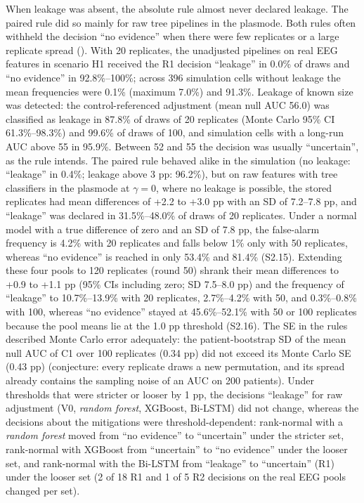 When leakage was absent, the absolute rule almost never declared leakage. The paired rule did so mainly for raw tree pipelines in the plasmode. Both rules often withheld the decision ``no evidence'' when there were few replicates or a large replicate spread ().
With 20 replicates, the unadjusted pipelines on real EEG features in scenario H1 received the R1 decision ``leakage'' in 0.0\% of draws and ``no evidence'' in 92.8\%--100\%; across 396 simulation cells without leakage the mean frequencies were 0.1\% (maximum 7.0\%) and 91.3\%.
Leakage of known size was detected: the control-referenced adjustment (mean null AUC 56.0) was classified as leakage in 87.8\% of draws of 20 replicates (Monte Carlo 95\% CI 61.3\%--98.3\%) and 99.6\% of draws of 100, and simulation cells with a long-run AUC above 55 in 95.9\%. Between 52 and 55 the decision was usually ``uncertain'', as the rule intends.
The paired rule behaved alike in the simulation (no leakage: ``leakage'' in 0.4\%; leakage above 3 pp: 96.2\%), but on raw features with tree classifiers in the plasmode at $\gamma=0$, where no leakage is possible, the stored replicates had mean differences of +2.2 to +3.0 pp with an SD of 7.2--7.8 pp, and ``leakage'' was declared in 31.5\%--48.0\% of draws of 20 replicates. Under a normal model with a true difference of zero and an SD of 7.8 pp, the false-alarm frequency is 4.2\% with 20 replicates and falls below 1\% only with 50 replicates, whereas ``no evidence'' is reached in only 53.4\% and 81.4\% (S2.15). Extending these four pools to 120 replicates (round 50) shrank their mean differences to +0.9 to +1.1 pp (95\% CIs including zero; SD 7.5--8.0 pp) and the frequency of ``leakage'' to 10.7\%--13.9\% with 20 replicates, 2.7\%--4.2\% with 50, and 0.3\%--0.8\% with 100, whereas ``no evidence'' stayed at 45.6\%--52.1\% with 50 or 100 replicates because the pool means lie at the 1.0 pp threshold (S2.16).
The SE in the rules described Monte Carlo error adequately: the patient-bootstrap SD of the mean null AUC of C1 over 100 replicates (0.34 pp) did not exceed its Monte Carlo SE (0.43 pp) (conjecture: every replicate draws a new permutation, and its spread already contains the sampling noise of an AUC on 200 patients).
Under thresholds that were stricter or looser by 1 pp, the decisions ``leakage'' for raw adjustment (V0, \textit{random forest}, XGBoost, Bi-LSTM) did not change, whereas the decisions about the mitigations were threshold-dependent: rank-normal with a \textit{random forest} moved from ``no evidence'' to ``uncertain'' under the stricter set, rank-normal with XGBoost from ``uncertain'' to ``no evidence'' under the looser set, and rank-normal with the Bi-LSTM from ``leakage'' to ``uncertain'' (R1) under the looser set (2 of 18 R1 and 1 of 5 R2 decisions on the real EEG pools changed per set).

